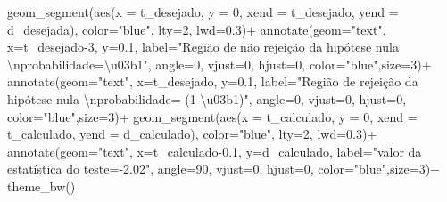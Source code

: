 \documentclass[
]{book}
\newenvironment{Shaded}{\begin{snugshade}}{\end{snugshade}}
\newcommand{\AttributeTok}[1]{\textcolor[rgb]{0.77,0.63,0.00}{#1}}
\newcommand{\DecValTok}[1]{\textcolor[rgb]{0.00,0.00,0.81}{#1}}
\newcommand{\FloatTok}[1]{\textcolor[rgb]{0.00,0.00,0.81}{#1}}
\newcommand{\FunctionTok}[1]{\textcolor[rgb]{0.00,0.00,0.00}{#1}}
\newcommand{\NormalTok}[1]{#1}
\newcommand{\SpecialCharTok}[1]{\textcolor[rgb]{0.00,0.00,0.00}{#1}}
\newcommand{\StringTok}[1]{\textcolor[rgb]{0.31,0.60,0.02}{#1}}
\begin{document}
\begin{Shaded}
\begin{Highlighting}[]
  \FunctionTok{geom\_segment}\NormalTok{(}\FunctionTok{aes}\NormalTok{(}\AttributeTok{x =}\NormalTok{ t\_desejado, }\AttributeTok{y =} \DecValTok{0}\NormalTok{, }\AttributeTok{xend =}\NormalTok{ t\_desejado, }\AttributeTok{yend =}\NormalTok{ d\_desejada), }\AttributeTok{color=}\StringTok{"blue"}\NormalTok{, }\AttributeTok{lty=}\DecValTok{2}\NormalTok{, }\AttributeTok{lwd=}\FloatTok{0.3}\NormalTok{)}\SpecialCharTok{+}
  \FunctionTok{annotate}\NormalTok{(}\AttributeTok{geom=}\StringTok{"text"}\NormalTok{, }\AttributeTok{x=}\NormalTok{t\_desejado}\DecValTok{{-}3}\NormalTok{, }\AttributeTok{y=}\FloatTok{0.1}\NormalTok{, }\AttributeTok{label=}\StringTok{"Região de não rejeição da hipótese nula }\SpecialCharTok{\textbackslash{}n}\StringTok{probabilidade=\textbackslash{}u03b1"}\NormalTok{, }\AttributeTok{angle=}\DecValTok{0}\NormalTok{, }\AttributeTok{vjust=}\DecValTok{0}\NormalTok{, }\AttributeTok{hjust=}\DecValTok{0}\NormalTok{, }\AttributeTok{color=}\StringTok{"blue"}\NormalTok{,}\AttributeTok{size=}\DecValTok{3}\NormalTok{)}\SpecialCharTok{+}
 \FunctionTok{annotate}\NormalTok{(}\AttributeTok{geom=}\StringTok{"text"}\NormalTok{, }\AttributeTok{x=}\NormalTok{t\_desejado, }\AttributeTok{y=}\FloatTok{0.1}\NormalTok{, }\AttributeTok{label=}\StringTok{"Região de rejeição da hipótese nula }\SpecialCharTok{\textbackslash{}n}\StringTok{probabilidade= (1{-}\textbackslash{}u03b1)"}\NormalTok{, }\AttributeTok{angle=}\DecValTok{0}\NormalTok{, }\AttributeTok{vjust=}\DecValTok{0}\NormalTok{, }\AttributeTok{hjust=}\DecValTok{0}\NormalTok{, }\AttributeTok{color=}\StringTok{"blue"}\NormalTok{,}\AttributeTok{size=}\DecValTok{3}\NormalTok{)}\SpecialCharTok{+}
 \FunctionTok{geom\_segment}\NormalTok{(}\FunctionTok{aes}\NormalTok{(}\AttributeTok{x =}\NormalTok{ t\_calculado, }\AttributeTok{y =} \DecValTok{0}\NormalTok{, }\AttributeTok{xend =}\NormalTok{ t\_calculado, }\AttributeTok{yend =}\NormalTok{ d\_calculado), }\AttributeTok{color=}\StringTok{"blue"}\NormalTok{, }\AttributeTok{lty=}\DecValTok{2}\NormalTok{, }\AttributeTok{lwd=}\FloatTok{0.3}\NormalTok{)}\SpecialCharTok{+}
 \FunctionTok{annotate}\NormalTok{(}\AttributeTok{geom=}\StringTok{"text"}\NormalTok{, }\AttributeTok{x=}\NormalTok{t\_calculado}\FloatTok{{-}0.1}\NormalTok{, }\AttributeTok{y=}\NormalTok{d\_calculado, }\AttributeTok{label=}\StringTok{"valor da estatística do teste={-}2.02"}\NormalTok{, }\AttributeTok{angle=}\DecValTok{90}\NormalTok{, }\AttributeTok{vjust=}\DecValTok{0}\NormalTok{, }\AttributeTok{hjust=}\DecValTok{0}\NormalTok{, }\AttributeTok{color=}\StringTok{"blue"}\NormalTok{,}\AttributeTok{size=}\DecValTok{3}\NormalTok{)}\SpecialCharTok{+}
  \FunctionTok{theme\_bw}\NormalTok{()}
\end{Highlighting}
\end{Shaded}
\end{document}
